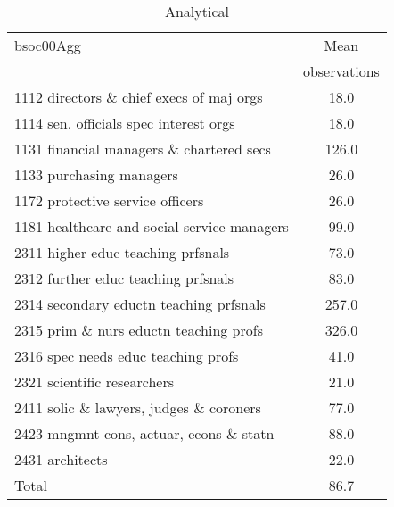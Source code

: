 \begin{table}
	\centering
	\caption{Analytical}
	\begin{tabular}{lc}
	\toprule	
		
bsoc00Agg&Mean \\
&observations \\
\hline
1112 directors \& chief execs of maj orgs&18.0 \\
1114 sen. officials spec interest orgs&18.0 \\
1131 financial managers \& chartered secs&126.0 \\
1133 purchasing managers&26.0 \\
1172 protective service officers&26.0 \\
1181 healthcare and social service managers&99.0 \\
2311 higher educ teaching prfsnals&73.0 \\
2312 further educ teaching prfsnals&83.0 \\
2314 secondary eductn teaching prfsnals&257.0 \\
2315 prim \& nurs eductn teaching profs&326.0 \\
2316 spec needs educ teaching profs&41.0 \\
2321 scientific researchers&21.0 \\
2411 solic \& lawyers, judges \& coroners&77.0 \\
2423 mngmnt cons, actuar, econs \& statn&88.0 \\
2431 architects&22.0 \\
Total&86.7 \\
\bottomrule
\bottomrule
\end{tabular}
\end{table}
